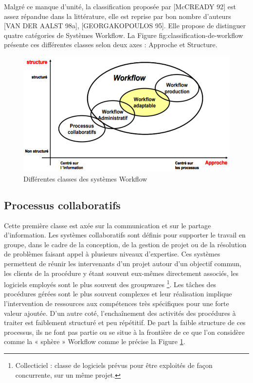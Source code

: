 Malgré ce manque d’unité, la classification proposée par [McCREADY 92] est assez répandue dans la littérature, elle est reprise par bon nombre d’auteurs [VAN DER AALST 98a],
[GEORGAKOPOULOS 95]. Elle propose de distinguer quatre catégories de Systèmes Workflow. La Figure fig:classification-de-workflow présente ces différentes classes selon deux axes : Approche et Structure.

\begin{figure}[h]
	\centering
	\includegraphics[width=0.7\linewidth]{"images/classification de workflow"}
	\caption{ Différentes classes des systèmes Workflow 
}
	\label{fig:classification-de-workflow}
\end{figure}


\subsection{Processus collaboratifs }
Cette première classe est axée sur la communication et sur le partage d’information. Les systèmes collaboratifs sont définis pour supporter le travail en groupe, dans le cadre de la conception, de la gestion de projet ou de la résolution de problèmes faisant appel à plusieurs niveaux d’expertise. Ces systèmes permettent de réunir les intervenants d’un projet autour d’un objectif commun, les clients de la procédure y étant souvent eux-mêmes directement associés, les logiciels employés sont le plus souvent des groupwares
\footnote{\samepage  Collecticiel : classe de logiciels prévus pour être exploités de façon concurrente, sur un même projet.}. Les tâches des procédures gérées sont le plus souvent complexes et leur réalisation implique l’intervention de ressources aux compétences très spécifiques pour une forte valeur ajoutée. D’un autre coté, l’enchaînement des activités des procédures à traiter est faiblement structuré et peu répétitif.
De part la faible structure de ces processus, ils ne font pas partie ou se situe à la frontière de ce que l’on considère comme la « sphère » Workflow comme le précise la Figure \ref{fig:classification-de-workflow}. 

